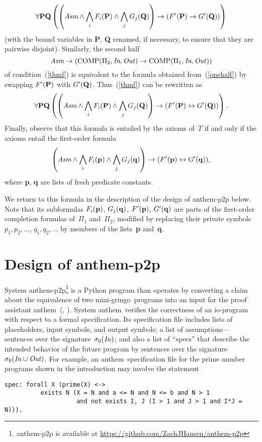 \documentclass{tlp}
\def\citeb#1{(\citeauthor{#1}, \citeyear{#1})}
\def\lrar{\leftrightarrow}
\def\beq{\begin{equation}}
\def\eeq#1{\label{#1}\end{equation}}
\def\gringo{{\sc gringo}}
\def\anthem{{\sc anthem}}
\begin{document}
\beq
\forall {\bf PQ}\left(\left(
    \emph{Asm}\land\bigwedge_i F_i({\bf P}) 
\land\bigwedge_j G_j({\bf Q}) \right) \to (F'({\bf P})\to G'({\bf Q}))\right)
\eeq{onehalf}
(with the bound variables in {\bf P}, {\bf Q} renamed, if necessary, to ensure
that they are pairwise disjoint).
Similarly, the second half
$$%
\emph{Asm}\to(\hbox{COMP}(\Pi_2,\emph{In},\emph{Out\/}) \to
\hbox{COMP}(\Pi_1,\emph{In},\emph{Out\/}))
$$%
of condition~(\ref{thmf}) is equivalent to the formula obtained
from~(\ref{onehalf}) by swapping $F'({\bf P})$ with $G'({\bf Q})$.
Thus~(\ref{thmf}) can be rewritten as
$$
\forall {\bf PQ}\left(\left(
   \emph{Asm}\land\bigwedge_i F_i({\bf P}) 
   \land\bigwedge_j G_j({\bf Q}) \right) \to
          (F'({\bf P})\lrar G'({\bf Q}))\right).
$$
Finally, observe that this formula is entailed by the axioms of~$T$ if
and only if the axioms entail the first-order formula
\beq
\left(
    \emph{Asm}\land\bigwedge_i F_i({\bf p})
\land\bigwedge_j G_j({\bf q}) \right) \to (F'({\bf p})\lrar G'({\bf q})),
\eeq{thmffo}
where {\bf p}, {\bf q} are lists of fresh predicate constants.

We return to this formula in the description of the design of
{\sc anthem-p2p} below.  Note that its subformulas
$F_i({\bf p})$, $G_j({\bf q})$,
$F'({\bf p})$,
$G'({\bf q})$ are parts of the first-order completion
formulas of~$\Pi_1$ and~$\Pi_2$, modified by replacing their private symbols
$p_1,p_2,\dots$, $q_1,q_2,\dots$ by members of the lists~{\bf p} and~{\bf q}.

\section{Design of {\sc anthem-p2p}} \label{sec:ontop}

System {\sc anthem-p2p}\footnote{{\sc anthem-p2p} is available at \url{https://github.com/ZachJHansen/anthem-p2p}} is a Python program than operates by converting a claim
about the equivalence of two mini-\gringo\ programs
into an input for the proof assistant \anthem\ \citeb{fan20}. 
System \anthem\ verifies the correctness of an io-program with
respect to a formal specification.  Its specification file
includes lists of placeholders, input symbols, and
output symbols; a list of assumptions---sentences over the
signature~$\sigma_0(\emph{In\/})$; and also a list of ``specs''
that describe the intended behavior of the future program by sentences over the
signature~$\sigma_0(\emph{In\/}\cup\emph{Out\/})$.  For example, an
\anthem\ specification file for the prime number programs shown in the
introduction may involve the statement
\begin{verbatim}
spec: forall X (prime(X) <->
          exists N (X = N and a <= N and N <= b and N > 1
                    and not exists I, J (I > 1 and J > 1 and I*J = N))).
\end{verbatim}
\end{document}
